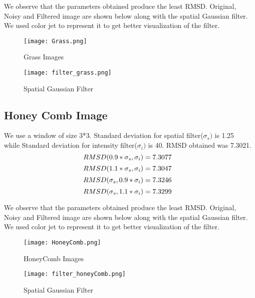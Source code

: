 \documentclass[12pt, a4paper]{article}
\begin{document}
We observe that the parameters obtained produce the least RMSD. Original, Noisy and Filtered image are shown below along with the spatial Gaussian filter. We used color jet to represent it to get better visualization of the filter.
\begin{figure}[h!]
  \centering
    \texttt{[image: Grass.png]}
    \caption{Grass Images}
  \label{fig:1}
\end{figure}

\begin{figure}[h!]
  \centering
    \texttt{[image: filter\_grass.png]}
    \caption{Spatial Gaussian Filter}
  \label{fig:2}
\end{figure}

\clearpage

\subsection*{Honey Comb Image}
We use a window of size 3*3. Standard deviation for spatial filter($\sigma_s)$ is 1.25 while Standard deviation for intensity filter($\sigma_i)$ is 40. RMSD obtained was 7.3021.
\begin{equation*}
    RMSD(0.9*\sigma_s, \sigma_i) = 7.3077\\
\end{equation*}
\begin{equation*}
    RMSD(1.1*\sigma_s, \sigma_i) = 7.3047\\
\end{equation*}
\begin{equation*}
    RMSD(\sigma_s, 0.9*\sigma_i) = 7.3246\\
\end{equation*}
\begin{equation*}
    RMSD(\sigma_s, 1.1*\sigma_i) = 7.3299\\
\end{equation*}

We observe that the parameters obtained produce the least RMSD. Original, Noisy and Filtered image are shown below along with the spatial Gaussian filter. We used color jet to represent it to get better visualization of the filter.
\begin{figure}[h!]
  \centering
    \texttt{[image: HoneyComb.png]}
    \caption{HoneyComb Images}
  \label{fig:1}
\end{figure}
\begin{figure}[h!]
  \centering
    \texttt{[image: filter\_honeyComb.png]}
    \caption{Spatial Gaussian Filter}
  \label{fig:3}
\end{figure}
\end{document}
